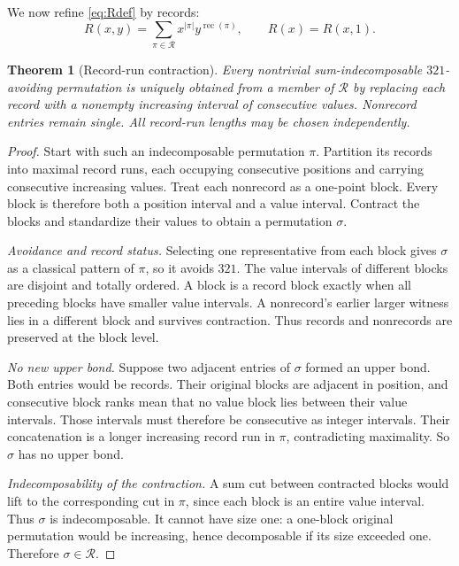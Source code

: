 \documentclass[11pt,a4paper]{article}
\newtheorem{theorem}{Theorem}[section]
\theoremstyle{definition}
\theoremstyle{remark}
\newcommand{\rec}{\operatorname{rec}}
\newcommand{\core}{\mathcal{R}}
\begin{document}
We now refine \eqref{eq:Rdef} by records:
\begin{equation}\label{eq:Rxy}
 R(x,y)=\sum_{\pi\in\core}x^{|\pi|}y^{\rec(\pi)},
 \qquad R(x)=R(x,1).
\end{equation}

\begin{theorem}[Record-run contraction]\label{thm:contraction}
Every nontrivial sum-indecomposable $321$-avoiding permutation is uniquely
obtained from a member of $\core$ by replacing each record with a nonempty
increasing interval of consecutive values. Nonrecord entries remain single.
All record-run lengths may be chosen independently.
\end{theorem}

\begin{proof}
Start with such an indecomposable permutation $\pi$. Partition its records
into maximal record runs, each occupying consecutive positions and carrying
consecutive increasing values. Treat each nonrecord as a one-point block.
Every block is therefore both a position interval and a value interval.
Contract the blocks and standardize their values to obtain a permutation
$\sigma$.

\emph{Avoidance and record status.} Selecting one representative from each
block gives $\sigma$ as a classical pattern of $\pi$, so it avoids $321$.
The value intervals of different blocks are disjoint and totally ordered.
A block is a record block exactly when all preceding blocks have smaller
value intervals. A nonrecord's earlier larger witness lies in a different
block and survives contraction. Thus records and nonrecords are preserved
at the block level.

\emph{No new upper bond.} Suppose two adjacent entries of $\sigma$ formed
an upper bond. Both entries would be records. Their original blocks are
adjacent in position, and consecutive block ranks mean that no value block
lies between their value intervals. Those intervals must therefore be
consecutive as integer intervals. Their concatenation is a longer increasing
record run in $\pi$, contradicting maximality. So $\sigma$ has no upper bond.

\emph{Indecomposability of the contraction.} A sum cut between contracted
blocks would lift to the corresponding cut in $\pi$, since each block is
an entire value interval. Thus $\sigma$ is indecomposable. It cannot have
size one: a one-block original permutation would be increasing, hence
decomposable if its size exceeded one. Therefore $\sigma\in\core$.


\end{proof}
\end{document}
